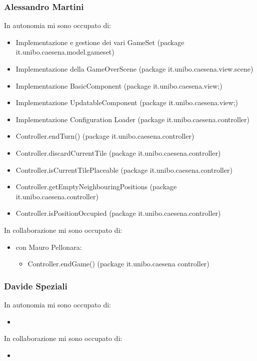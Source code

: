 \subsubsection*{Alessandro Martini}
In autonomia mi sono occupato di:
\begin{itemize}
    \item Implementazione e gestione dei vari GameSet (package it.unibo.caesena.model.gameset)
    \item Implementazione della GameOverScene (package it.unibo.caesena.view.scene)
    \item Implementazione BasicComponent (package it.unibo.caesena.view;)
    \item Implementazione UpdatableComponent (package it.unibo.caesena.view;)
    \item Implementazione Configuration Loader (package it.unibo.caesena.controller)
    \item Controller.endTurn() (package it.unibo.caesena.controller)
    \item Controller.discardCurrentTile (package it.unibo.caesena.controller)
    \item Controller.isCurrentTilePlaceable (package it.unibo.caesena.controller)
    \item Controller.getEmptyNeighbouringPositions (package it.unibo.caesena.controller)
    \item Controller.isPositionOccupied (package it.unibo.caesena.controller)
\end{itemize}
In collaborazione mi sono occupato di:
\begin{itemize}
    \item con Mauro Pellonara:
    \begin{itemize}
        \item Controller.endGame() (package it.unibo.caesena controller)
    \end{itemize}
\end{itemize}

\subsubsection*{Davide Speziali}
In autonomia mi sono occupato di:
\begin{itemize}
    \item
\end{itemize}
In collaborazione mi sono occupato di:
\begin{itemize}
    \item
\end{itemize}

